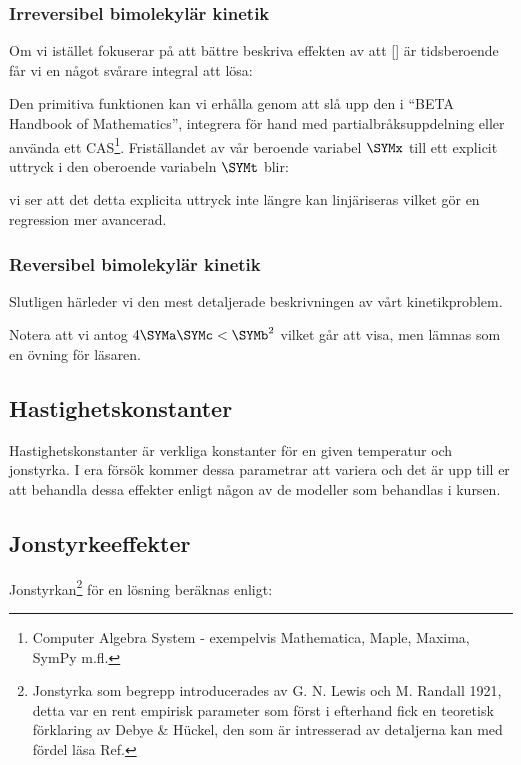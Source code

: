 \subsubsection{Irreversibel bimolekylär kinetik}
\label{sec:irrev_binary}
Om vi istället fokuserar på att bättre beskriva effekten av att
[] är tidsberoende får vi en något svårare integral att lösa:



Den primitiva funktionen kan vi erhålla genom att slå upp den i ``BETA Handbook of
Mathematics'', integrera för hand med partialbråksuppdelning eller
använda ett CAS\footnote{  Computer Algebra System -   exempelvis
  Mathematica, Maple, Maxima, SymPy m.fl.}. Friställandet av vår beroende
variabel $\SYMx$ till ett explicit uttryck i den oberoende variabeln $\SYMt$
blir:



vi ser att det detta explicita uttryck inte längre kan linjäriseras
vilket gör en regression mer avancerad.

\subsubsection{Reversibel bimolekylär kinetik}
Slutligen härleder vi den mest detaljerade beskrivningen av vårt kinetikproblem.
\label{sec:rev_binary}




Notera att vi antog $4\SYMa\SYMc < \SYMb^2$ vilket går att visa, men lämnas som en
övning för läsaren.


\subsection{Hastighetskonstanter}
Hastighetskonstanter är verkliga konstanter för en given temperatur och
jonstyrka. I era försök kommer dessa parametrar att variera och det är
upp till er att behandla dessa effekter enligt någon av de modeller som
behandlas i kursen.

\subsection{Jonstyrkeeffekter}
Jonstyrkan\footnote{Jonstyrka som begrepp introducerades av
  G. N. Lewis och M. Randall 1921, detta var en rent empirisk parameter
  som först i efterhand fick en teoretisk förklaring av Debye \&
  H\"uckel, den som är intresserad av detaljerna kan med fördel läsa
  Ref.\cite{sastre_de_vicente_concept_2004}
} för en lösning beräknas enligt:

